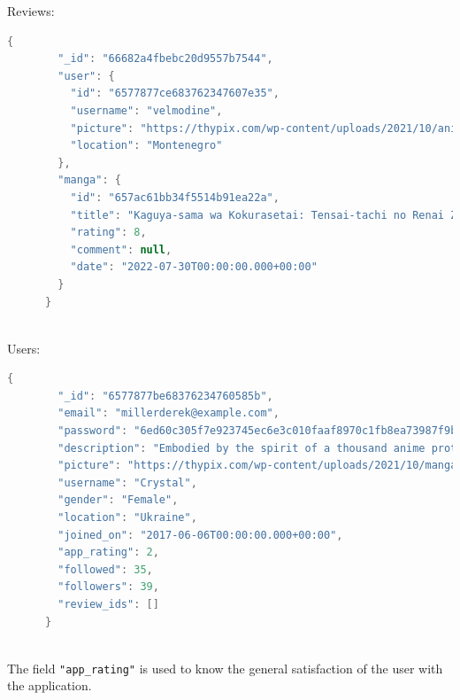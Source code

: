 \newpage
Reviews:
\begin{mdframed}[backgroundcolor=yellow!20, innerleftmargin=10pt, innerrightmargin=10pt]
    \begin{lstlisting}[language=java]
      {
        "_id": "66682a4fbebc20d9557b7544",
        "user": {
          "id": "6577877ce683762347607e35",
          "username": "velmodine",
          "picture": "https://thypix.com/wp-content/uploads/2021/10/anime-avatar-profile-pic...",
          "location": "Montenegro"
        },
        "manga": {
          "id": "657ac61bb34f5514b91ea22a",
          "title": "Kaguya-sama wa Kokurasetai: Tensai-tachi no Renai Zunousen",
          "rating": 8,
          "comment": null,
          "date": "2022-07-30T00:00:00.000+00:00"
        }
      }
      
    \end{lstlisting}
\end{mdframed}

Users:
\begin{mdframed}[backgroundcolor=yellow!20, innerleftmargin=10pt, innerrightmargin=10pt]
    \begin{lstlisting}[language=java]
      {
        "_id": "6577877be68376234760585b",
        "email": "millerderek@example.com",
        "password": "6ed60c305f7e923745ec6e3c010faaf8970c1fb8ea73987f9bf6d5ed053aa94c",
        "description": "Embodied by the spirit of a thousand anime protagonists.",
        "picture": "https://thypix.com/wp-content/uploads/2021/10/manga-profile-picture-82...",
        "username": "Crystal",
        "gender": "Female",
        "location": "Ukraine",
        "joined_on": "2017-06-06T00:00:00.000+00:00",
        "app_rating": 2,
        "followed": 35,
        "followers": 39,
        "review_ids": []
      }
      
    \end{lstlisting}
\end{mdframed}


The field \texttt{"app\_rating"} is used to know the general satisfaction of the user with the application.

\newpage

